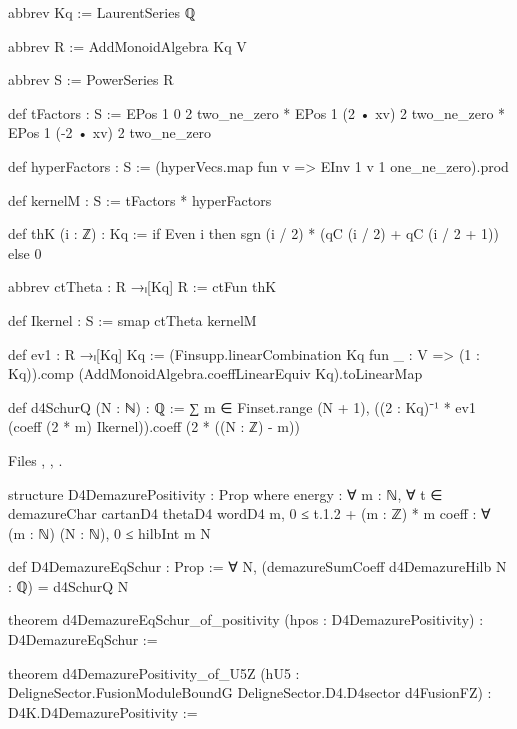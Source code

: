 \begin{leancode}
abbrev Kq := LaurentSeries ℚ

abbrev R := AddMonoidAlgebra Kq V

abbrev S := PowerSeries R

def tFactors : S :=
  EPos 1 0 2 two_ne_zero * EPos 1 (2 • xv) 2 two_ne_zero * EPos 1 (-2 • xv) 2 two_ne_zero

def hyperFactors : S := (hyperVecs.map fun v => EInv 1 v 1 one_ne_zero).prod

def kernelM : S := tFactors * hyperFactors

def thK (i : ℤ) : Kq := if Even i then sgn (i / 2) * (qC (i / 2) + qC (i / 2 + 1)) else 0

abbrev ctTheta : R →ₗ[Kq] R := ctFun thK

def Ikernel : S := smap ctTheta kernelM

def ev1 : R →ₗ[Kq] Kq :=
  (Finsupp.linearCombination Kq fun _ : V => (1 : Kq)).comp
    (AddMonoidAlgebra.coeffLinearEquiv Kq).toLinearMap

def d4SchurQ (N : ℕ) : ℚ :=
  ∑ m ∈ Finset.range (N + 1), ((2 : Kq)⁻¹ * ev1 (coeff (2 * m) Ikernel)).coeff (2 * ((N : ℤ) - m))
\end{leancode}
\noindent Files , ,
.
\begin{leancode}
structure D4DemazurePositivity : Prop where
  energy : ∀ m : ℕ, ∀ t ∈ demazureChar cartanD4 thetaD4 wordD4 m, 0 ≤ t.1.2 + (m : ℤ) * m
  coeff : ∀ (m : ℕ) (N : ℕ), 0 ≤ hilbInt m N

def D4DemazureEqSchur : Prop := ∀ N, (demazureSumCoeff d4DemazureHilb N : ℚ) = d4SchurQ N

theorem d4DemazureEqSchur_of_positivity (hpos : D4DemazurePositivity) : D4DemazureEqSchur :=

theorem d4DemazurePositivity_of_U5Z
    (hU5 : DeligneSector.FusionModuleBoundG DeligneSector.D4.D4sector d4FusionFZ) :
    D4K.D4DemazurePositivity :=
\end{leancode}
